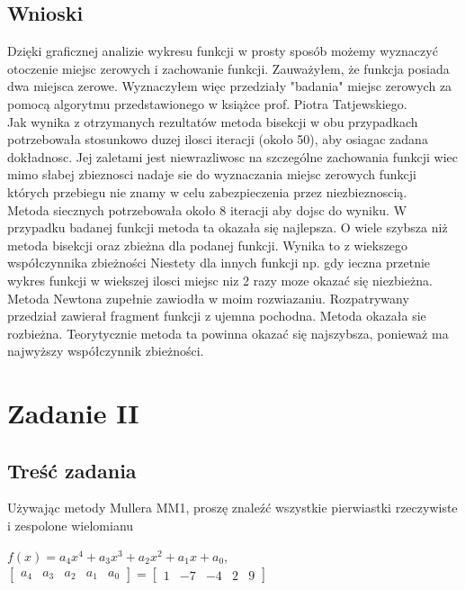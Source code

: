 \documentclass[11pt, oneside]{article}   	%
\begin{document}
\subsection{Wnioski}
Dzięki graficznej analizie wykresu funkcji w prosty sposób możemy wyznaczyć otoczenie miejsc zerowych i zachowanie funkcji. Zauważyłem, że funkcja posiada dwa miejsca zerowe. Wyznaczyłem więc przedziały "badania" miejsc zerowych za pomocą algorytmu przedstawionego w książce prof. Piotra Tatjewskiego. \\
 Jak wynika z otrzymanych rezultatów metoda bisekcji
w obu przypadkach potrzebowała stosunkowo duzej ilosci iteracji (około 50), aby osiagac zadana dokładnosc. Jej
zaletami jest niewrazliwosc na szczególne zachowania funkcji wiec mimo słabej zbieznosci nadaje sie
do wyznaczania miejsc zerowych funkcji których przebiegu nie znamy w celu zabezpieczenia przez
niezbieznoscią. \\
 Metoda siecznych potrzebowała około 8 iteracji aby dojsc do wyniku. W przypadku badanej funkcji metoda ta okazała się najlepsza. O wiele szybsza niż metoda bisekcji oraz zbieżna dla podanej funkcji. Wynika to z wiekszego współczynnika zbieżności Niestety dla innych funkcji np. gdy ieczna przetnie wykres funkcji w wiekszej ilosci miejsc niz 2 razy moze okazać się niezbieżna. \\
 Metoda Newtona zupełnie zawiodła w moim rozwiazaniu. Rozpatrywany przedział zawierał
fragment funkcji z ujemna pochodna. Metoda okazała sie rozbieżna. Teorytycznie metoda ta powinna okazać się najszybsza, ponieważ ma najwyższy współczynnik zbieżności.


\section{Zadanie II}
\subsection{Treść zadania}
Używając metody Mullera MM1, proszę znaleźć wszystkie pierwiastki rzeczywiste i zespolone wielomianu
\begin{center}
$f(x) = a_{4}x^4+a_{3}x^3+a_{2}x^2+a_{1}x+a_{0}$,  
$
\left[
\begin{array}{ccccc}
       a_{4} & a_{3} & a_{2} & a_{1} & a_{0}
\end{array}
\right]
=
\left[
\begin{array}{ccccc}
       1 & -7 & -4 & 2 & 9
\end{array}
\right]$
\end{center}
\end{document}
